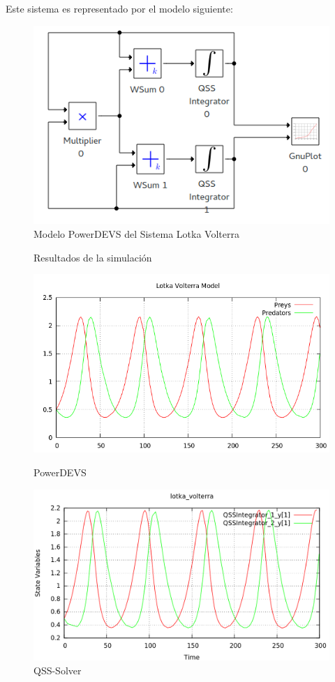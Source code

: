 	Este sistema es representado por el modelo siguiente:

\begin{figure}[H]
\includegraphics[width=0.75\linewidth]{lotka_voltera_pwd}
\caption{Modelo PowerDEVS del Sistema Lotka Volterra}
\label{model:lotka_voltera}
\end{figure}

\begin{figure}[H]
\centering
Resultados de la simulación \\
\begin{minipage}{0.5\textwidth}
\centering
 \includegraphics[width=\linewidth]{lotka_voltera-pd}
\caption{PowerDEVS}
\label{graph:lotka_voltera-pd}
\end{minipage}\hfill
\begin{minipage}{0.5\textwidth}
\centering
 \includegraphics[width=\linewidth]{lotka_voltera-qss}
\caption{QSS-Solver}
\label{graph:lotka_voltera-qss}
\end{minipage}
\end{figure}



